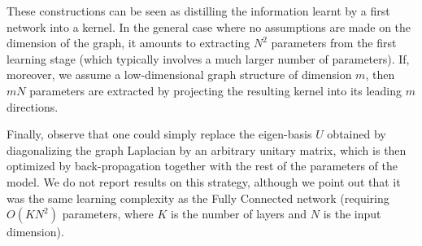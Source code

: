 \documentclass{article} %
\begin{document}
These constructions can be seen as distilling the information learnt by a first network into a kernel. In the general case where no assumptions are made on the dimension of the graph, it amounts to extracting $N^2$ parameters from the first learning stage (which typically involves a much larger number of parameters). If, moreover, we assume a low-dimensional graph structure of dimension $m$, then $m N$ parameters are extracted by projecting the resulting kernel into its leading $m$ directions.

Finally, observe that one could simply replace the eigen-basis $U$ obtained by diagonalizing the graph Laplacian by an arbitrary unitary matrix, which is then optimized by back-propagation together with the rest of the parameters of the model. We do not report results on this strategy, although we point out that it was the same learning complexity as the Fully Connected network (requiring $O(K N^2)$ parameters, where $K$ is the number of layers and $N$ is the input dimension).





\end{document}
